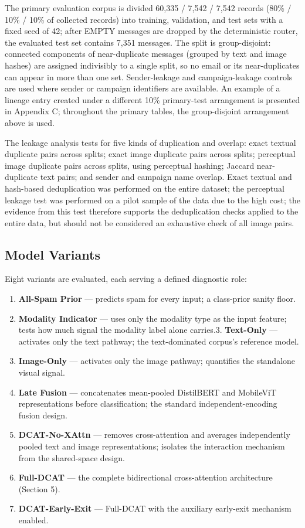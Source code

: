 \documentclass[10pt,twoside]{article}
\begin{document}
The primary evaluation corpus is divided 60,335 / 7,542 / 7,542 records (80\% / 10\% / 10\% of collected records) into training, validation, and test sets with a fixed seed of 42; after EMPTY messages are dropped by the deterministic router, the evaluated test set contains 7,351 messages. The split is group-disjoint: connected components of near-duplicate messages (grouped by text and image hashes) are assigned indivisibly to a single split, so no email or its near-duplicates can appear in more than one set. Sender-leakage and campaign-leakage controls are used where sender or campaign identifiers are available. An example of a lineage entry created under a different 10\% primary-test arrangement is presented in Appendix C; throughout the primary tables, the group-disjoint arrangement above is used.

The leakage analysis tests for five kinds of duplication and overlap: exact textual duplicate pairs across splits; exact image duplicate pairs across splits; perceptual image duplicate pairs across splits, using perceptual hashing; Jaccard near-duplicate text pairs; and sender and campaign name overlap. Exact textual and hash-based deduplication was performed on the entire dataset; the perceptual leakage test was performed on a pilot sample of the data due to the high cost; the evidence from this test therefore supports the deduplication checks applied to the entire data, but should not be considered an exhaustive check of all image pairs.

\subsection{Model Variants}\label{sec:6.3}

Eight variants are evaluated, each serving a defined diagnostic role:

\begin{enumerate}[leftmargin=*,itemsep=1.5pt]
\item[1.] \textbf{All-Spam Prior} --- predicts spam for every input; a class-prior sanity floor.
\item[2.] \textbf{Modality Indicator} --- uses only the modality type as the input feature; tests how much signal the modality label alone carries.3. \textbf{Text-Only} --- activates only the text pathway; the text-dominated corpus's reference model.
\item[4.] \textbf{Image-Only} --- activates only the image pathway; quantifies the standalone visual signal.
\item[5.] \textbf{Late Fusion} --- concatenates mean-pooled DistilBERT and MobileViT representations before classification; the standard independent-encoding fusion design.
\item[6.] \textbf{DCAT-No-XAttn} --- removes cross-attention and averages independently pooled text and image representations; isolates the interaction mechanism from the shared-space design.
\item[7.] \textbf{Full-DCAT} --- the complete bidirectional cross-attention architecture (Section 5).
\item[8.] \textbf{DCAT-Early-Exit} --- Full-DCAT with the auxiliary early-exit mechanism enabled.
\end{enumerate}
\end{document}
